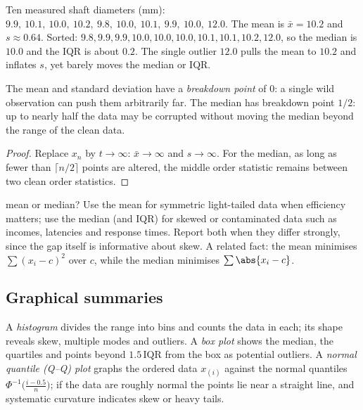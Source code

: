 \begin{example}
Ten measured shaft diameters (mm): $9.9,\ 10.1,\ 10.0,\ 10.2,\ 9.8,\ 10.0,\ 10.1,\ 9.9,\ 10.0,\ 12.0$. The mean is $\bar{x}=10.2$ and $s\approx0.64$. Sorted: $9.8,9.9,9.9,10.0,10.0,10.0,10.1,10.1,10.2,12.0$, so the median is $10.0$ and the IQR is about $0.2$. The single outlier $12.0$ pulls the mean to $10.2$ and inflates $s$, yet barely moves the median or IQR.
\end{example}

\begin{theorem}\label{thm:robust}
The mean and standard deviation have a \emph{breakdown point} of $0$: a single wild observation can push them arbitrarily far. The median has breakdown point $1/2$: up to nearly half the data may be corrupted without moving the median beyond the range of the clean data.
\end{theorem}

\begin{proof}
Replace $x_n$ by $t\to\infty$: $\bar{x}\to\infty$ and $s\to\infty$. For the median, as long as fewer than $\lceil n/2\rceil$ points are altered, the middle order statistic remains between two clean order statistics.
\end{proof}

\begin{interview}{mean or median?}
Use the mean for symmetric light-tailed data when efficiency matters; use the median (and IQR) for skewed or contaminated data such as incomes, latencies and response times. Report both when they differ strongly, since the gap itself is informative about skew. A related fact: the mean minimises $\sum(x_i-c)^2$ over $c$, while the median minimises $\sum\abs{x_i-c}$.
\end{interview}

\subsection*{Graphical summaries}

A \emph{histogram} divides the range into bins and counts the data in each; its shape reveals skew, multiple modes and outliers. A \emph{box plot} shows the median, the quartiles and points beyond $1.5\,\mathrm{IQR}$ from the box as potential outliers. A \emph{normal quantile (Q--Q) plot} graphs the ordered data $x_{(i)}$ against the normal quantiles $\Phi^{-1}\big(\tfrac{i-0.5}{n}\big)$; if the data are roughly normal the points lie near a straight line, and systematic curvature indicates skew or heavy tails.


